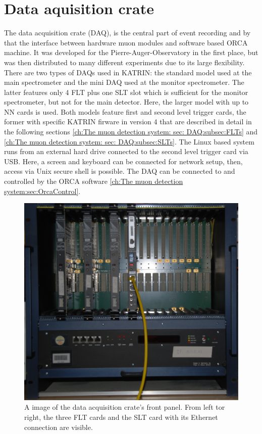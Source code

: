 \section{Data aquisition crate}
\label{ch:The muon detection system: sec: DAQ}
The data acquisition crate (DAQ), is the central part of event recording and by that the interface between hardware muon modules and software based ORCA machine. It was developed for the Pierre-Auger-Observatory in the first place, but was then distributed to many different experiments due to its large flexibility. There are two types of DAQs used in KATRIN: the standard model used at the main spectrometer and the mini DAQ used at the monitor spectrometer. The latter features only 4 FLT plus one SLT slot which is sufficient for the monitor spectrometer, but not for the main detector. Here, the larger model with up to NN cards is used. Both models feature first and second level trigger cards, the former with specific KATRIN firware in version \SI{4}{} that are described in detail in the following sections \ref{ch:The muon detection system: sec: DAQ:subsec:FLTs} and \ref{ch:The muon detection system: sec: DAQ:subsec:SLTs}. The Linux based system runs from an external hard drive connected to the second level trigger card via USB. Here, a screen and keyboard can be connected for network setup, then, access via Unix secure shell is possible. The DAQ can be connected to and controlled by the ORCA software \ref{ch:The muon detection system:sec:OrcaControl}. 

  \begin{figure}
  \centering
  
  	\includegraphics[width = 0.7 \textwidth]{graphics/muonModules/mainSpec/DAQ.jpg}
  \caption[Data acquisition crate]{A image of the data acquisition crate's front panel. From left tor right, the three FLT cards and the SLT card with its Ethernet connection are visible.}
  \label{fig:DAQ}
  \end{figure}

